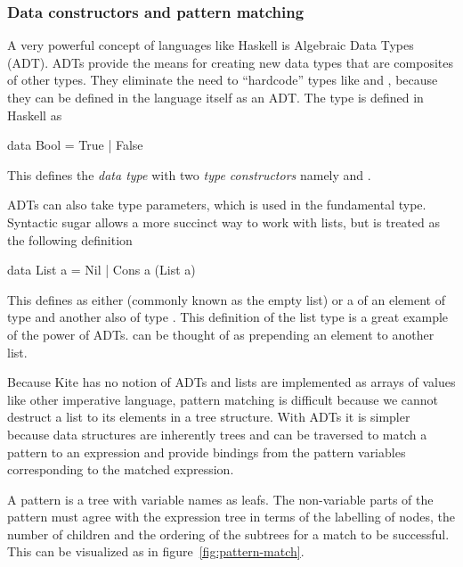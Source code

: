 \subsubsection{Data constructors and pattern matching}
A very powerful concept of languages like Haskell is Algebraic Data Types (ADT). ADTs provide the means for creating new data types that are composites of other types. They eliminate the need to ``hardcode'' types like  and , because they can be defined in the language itself as an ADT. The  type is defined in Haskell as

\begin{haskell}
data Bool = True | False
\end{haskell}

This defines the \emph{data type}  with two \emph{type constructors} namely  and .

ADTs can also take type parameters, which is used in the fundamental  type. Syntactic sugar allows a more succinct way to work with lists, but is treated as the following definition

\begin{haskell}
data List a = Nil | Cons a (List a)
\end{haskell}

This defines  as either  (commonly known as the empty list) or a  of an element of type  and another  also of type . This definition of the list type is a great example of the power of ADTs.  can be thought of as prepending an element to another list.

Because Kite has no notion of ADTs and lists are implemented as arrays of values like other imperative language, pattern matching is difficult because we cannot destruct a list to its elements in a tree structure. With ADTs it is simpler because data structures are inherently trees and can be traversed to match a pattern to an expression and provide bindings from the pattern variables corresponding to the matched expression.

A pattern is a tree with variable names as leafs. The non-variable parts of the pattern must agree with the expression tree in terms of the labelling of nodes, the number of children and the ordering of the subtrees\cite[p. 514]{wilhelm95} for a match to be successful. This can be visualized as in figure~\ref{fig:pattern-match}.


